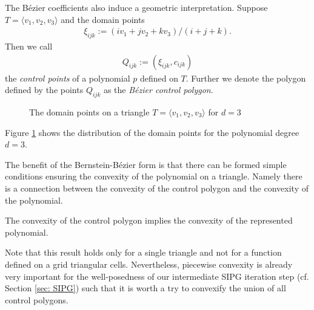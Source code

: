 The B\'ezier coefficients also induce a geometric interpretation. Suppose $T=\langle v_1, v_2, v_3 \rangle$ and the domain points
\begin{align}
	\xi_{ijk} := (i v_1+jv_2 + k v_3) / (i+j+k). \label{eq: domain points}
\end{align} 
Then we call 
\begin{align}
	Q_{ijk} := (\xi_{ijk}, c_{ijk}) \label{eq: control points}
\end{align} the \emph{control points} of a polynomial $p$ defined on $T$. Further we denote the polygon defined by the points $Q_{ijk}$ as the \emph{B\'ezier control polygon}.

\begin{figure}
	\centering
	
	\caption{The domain points on a triangle $T=\langle v_1, v_2, v_3 \rangle$ for $d=3$}
	\label{fig: domain points}
\end{figure}
Figure \ref{fig: domain points} shows the distribution of the domain points for the polynomial degree $d=3$.

The benefit of the Bernstein-B\'ezier form is that there can be formed simple conditions ensuring the convexity of the polynomial on a triangle. Namely there is a connection between the convexity of the control polygon and the convexity of the polynomial.
\begin{theorem}
	The convexity of the control polygon implies the convexity of the represented polynomial.
\end{theorem}
Note that this result holds only for a single triangle and not for a function defined on a grid triangular cells. Nevertheless, piecewise convexity is already very important for the well-posedness of our intermediate SIPG iteration step (cf. Section \ref{sec: SIPG}) such that it is worth a try to convexify the union of all control polygons.

